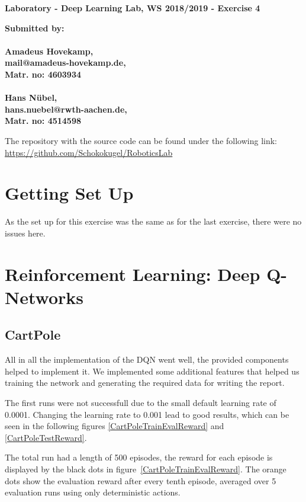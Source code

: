 \documentclass[
        a4paper,
        10pt,
        parskip = full,    %
    ]{scrartcl}
\begin{document}
\textbf{\large{Laboratory - Deep Learning Lab, WS 2018/2019 - Exercise 4}}

\textbf{\large{Submitted by:\\
\\
Amadeus Hovekamp,\\
mail@amadeus-hovekamp.de,\\
Matr. no: 4603934\\
\\
Hans Nübel,\\
hans.nuebel@rwth-aachen.de,\\
Matr. no: 4514598}}

The repository with the source code can be found under the following link:\\
\href{https://github.com/Schokokugel/RoboticsLab}
     {https://github.com/Schokokugel/RoboticsLab}


\section{Getting Set Up}

As the set up for this exercise was the same as for the last exercise, there were no issues here.

\section{Reinforcement Learning: Deep Q-Networks}

\subsection{CartPole}

All in all the implementation of the DQN went well, the provided components
helped to implement it. We implemented some additional features that helped us
training the network and generating the required data for writing the report.


The first runs were not successfull due to the small default learning
rate of 0.0001. Changing the learning rate to 0.001 lead to good results,
which can be seen in the following figures \ref{CartPoleTrainEvalReward}
and \ref{CartPoleTestReward}.


The total run had a length of 500 episodes, the reward for each episode is
displayed by the black dots in figure~\ref{CartPoleTrainEvalReward}. The orange dots
show the evaluation reward after every tenth episode, averaged over 5 evaluation
runs using only deterministic actions.
\end{document}
